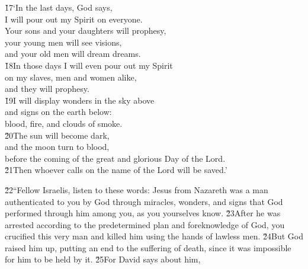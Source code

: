 \begin{poetry}
\poeml \v{17}`In the last days, God says, \\
\poemll    I will pour out my Spirit on everyone. \\
\poeml Your sons and your daughters will prophesy, \\
\poemll    your young men will see visions, \\
\poemlll       and your old men will dream dreams. \\
\poeml \v{18}In those days I will even pour out my Spirit \\
\poemll    on my slaves, men and women alike, \\
\poemlll       and they will prophesy. \\
\poeml \v{19}I will display wonders in the sky above \\
\poemll    and signs on the earth below: \\
\poemlll       blood, fire, and clouds of smoke. \\
\poeml \v{20}The sun will become dark, \\
\poemll    and the moon turn to blood, \\
\poemlll       before the coming of the great and glorious Day of the Lord. \\
\poeml \v{21}Then whoever calls on the name of the Lord will be saved.'
\end{poetry}

\v{22}``Fellow Israelis, listen to these words: Jesus from Nazareth was a man authenticated to you by God through miracles, wonders, and signs that God performed through him among you, as you yourselves know. \v{23}After he was arrested according to the predetermined plan and foreknowledge of God, you crucified this very man and killed him using the hands of lawless men. \v{24}But God raised him up, putting an end to the suffering of death, since it was impossible for him to be held by it. \v{25}For David says about him,

